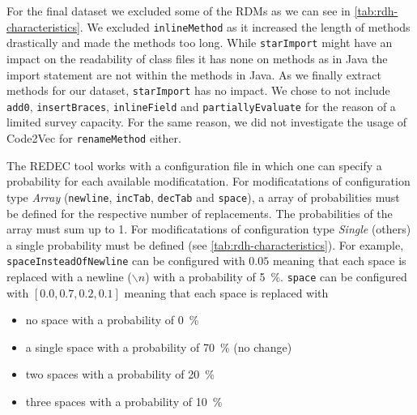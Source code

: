 \documentclass[%
class=scrreprt,
chapterprefix=false,%
open=right,%
twoside=false,%
paper=a4,%
logofile={Logo\_zentral\_farbig\_EN.png},%
thesistype=master,%
UKenglish,%
]{se2thesis}
\theoremstyle{definition}
\newcommand{\mod}{modificatation\xspace}
\newcommand{\mods}{modificatations\xspace}
\newcommand{\RDH}{Readability Decreaser\xspace}
\newcommand{\rdh}{REDEC\xspace}
\newcommand{\rdhs}{RDMs\xspace}
\newcommand{\RDHa}{\RDH (\rdh)\xspace} %
\begin{document}

	For the final dataset we excluded some of the \rdhs as we can see in \autoref{tab:rdh-characteristics}.
	We excluded \texttt{inlineMethod} as it increased the length of methods drastically and made the methods too long.
	While \texttt{starImport} might have an impact on the readability of class files it has none on methods as in Java the import statement are not within the methods in Java. As we finally extract methods for our dataset, \texttt{starImport} has no impact.
	We chose to not include \texttt{add0}, \texttt{insertBraces}, \texttt{inlineField} and \texttt{partiallyEvaluate} for the reason of a limited survey capacity.
	For the same reason, we did not investigate the usage of Code2Vec for \texttt{renameMethod} either.

	
	The \rdh tool works with a configuration file in which one can specify a probability for each available \mod.
	For \mods of configuration type \textit{Array} (\texttt{newline}, \texttt{incTab}, \texttt{decTab} and \texttt{space}), a array of probabilities must be defined for the respective number of replacements. The probabilities of the array must sum up to 1.
	For \mods of configuration type \textit{Single} (others) a single probability must be defined (see \autoref{tab:rdh-characteristics}).
	For example, \texttt{spaceInsteadOfNewline} can be configured with $0.05$ meaning that each space is replaced with a newline ($\backslash n$) with a probability of 5~\%.
	\texttt{space} can be configured with $[0.0, 0.7, 0.2, 0.1]$ meaning that each space is replaced with
	\begin{itemize}
		\item no space with a probability of 0~\%
		\item a single space with a probability of 70~\% (no change)
		\item two spaces with a probability of 20~\%
		\item three spaces with a probability of 10~\% 
	\end{itemize}
		
\end{document}
